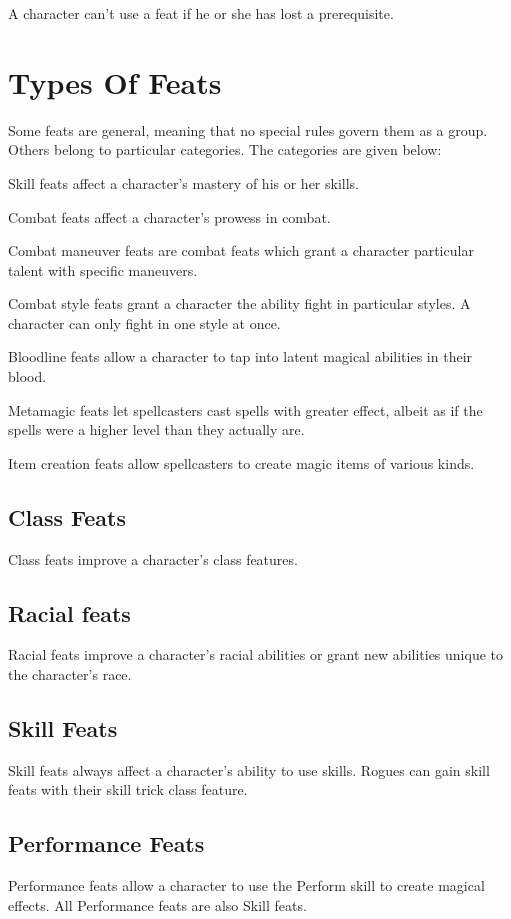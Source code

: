 A character can't use a feat if he or she has lost a prerequisite.

\section{Types Of Feats}
Some feats are general, meaning that no special rules govern
them as a group. Others belong to particular categories. The categories are given below:
\begin{itemize*}
\item Skill feats affect a character's mastery of his or her skills.
\item Combat feats affect a character's prowess in combat.
\item Combat maneuver feats are combat feats which grant a character particular talent with specific maneuvers.
\item Combat style feats grant a character the ability fight in particular styles. A character can only fight in one style at once.
\item Bloodline feats allow a character to tap into latent magical abilities in their blood.
\item Metamagic feats let spellcasters cast spells with greater effect, albeit as if the spells were a higher level than they actually are.
\item Item creation feats allow spellcasters to create magic items of various kinds.
\end{itemize*}

\subsection{Class Feats}
Class feats improve a character's class features.

\subsection{Racial feats}
Racial feats improve a character's racial abilities or grant new abilities unique to the character's race.

\subsection{Skill Feats}
Skill feats always affect a character's ability to use skills. Rogues can gain skill feats with their skill trick class feature.

\subsection{Performance Feats}
Performance feats allow a character to use the Perform skill to create magical effects. All Performance feats are also Skill feats.

